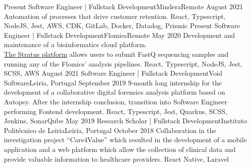 %
%
%
\begin{experiences}
  \experience
    {Present}   {Software Engineer | Fullstack Development}{Mindera}{Remote}
    {August 2021} {Automation of processes that drive customer retention.}
                  {React, Typescript, NodeJS, Jest, AWS, CDK, GitLab, Docker, Datadog, Prismic}
  \emptySeparator
  \experience
    {Present} {Software Engineer | Fullstack Development}{Flomics}{Remote}
    {May 2020}    {Development and maintenance of a bioinformatics cloud platform.\\
                  \href{https://cloud.flomics.com}{The Stratus platform} allows users to submit FastQ sequencing samples and running any of the Flomics' analysis pipelines.}
                  {React, Typescript, NodeJS, Jest, SCSS, AWS}
  \emptySeparator
  \experience
    {August 2021}     {Software Engineer | Fullstack Development}{Void Software}{Leiria, Portugal}
    {September 2019}    {9-month long internship for the development of a collaborative digital forensics analysis
                          platform based on Autopsy.
                          After the internship conclusion, transition into Software Engineer
                          performing Fontend development.}
                  {React, Typescript, Jest, Quarkus, SCSS, Jenkins, SonarQube}
  \emptySeparator
  \emptySeparator
  \experience
    {May 2019}     {Research Scholar | Fullstack Development}{Instituto Politécnico de Leiria}{Leiria, Portugal}
    {October 2018}    {Collaboration in the investigation project “Care4Value” which resulted in
                        the development of a mobile application and a web platform which allow
                        the collection of clinical data and provide valuable information to
                        healthcare providers.}
                    {React Native, Laravel}
  \emptySeparator
\end{experiences}
